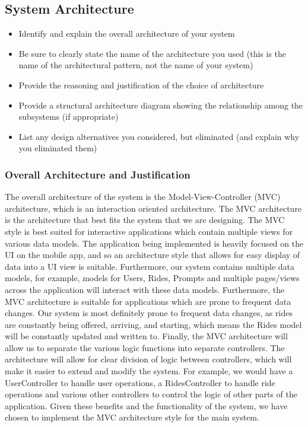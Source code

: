 \documentclass[]{article}
\begin{document}
\subsection{System Architecture}
\label{sub:system_architecture}
\begin{itemize}
	\item Identify and explain the overall architecture of your system
	\item Be sure to clearly state the name of the architecture you used (this is the name of the architectural pattern, not the name of your system)
	\item Provide the reasoning and justification of the choice of architecture
	\item Provide a structural architecture diagram showing the relationship among the subsystems (if appropriate)
	\item List any design alternatives you considered, but eliminated (and explain why you eliminated them)
\end{itemize}
\subsubsection{Overall Architecture and Justification}
\label{subsub:overall_architecture}
The overall architecture of the system is the Model-View-Controller (MVC) architecture, which is an interaction 
oriented architecture. The MVC architecture is the architecture that best fits the system that we are designing. The MVC style is best suited for 
interactive applications which contain multiple views for various data models. The application being implemented is heavily focused on the UI 
on the mobile app, and so an architecture style that allows for easy display of data into a UI view is suitable. Furthermore, our system contains multiple data models, for example, models for Users, 
Rides, Prompts and multiple pages/views across the application will interact with these data models. Furthermore, the MVC architecture is suitable for 
applications which are prone to frequent data changes. Our system is most definitely prone to frequent data changes, as rides are constantly being offered, 
arriving, and starting, which means the Rides model will be constantly updated and written to. Finally, the MVC architecture will allow us to separate the 
various logic functions into separate controllers. The architecture will allow for clear division of logic between controllers, which will make it easier 
to extend and modify the system. For example, we would have a UserController to handle user operations, a RidesController to handle ride operations and various 
other controllers to control the logic of other parts of the application. Given these benefits and the functionality of the system, we have chosen to implement 
the MVC architecture style for the main system.
\end{document}
